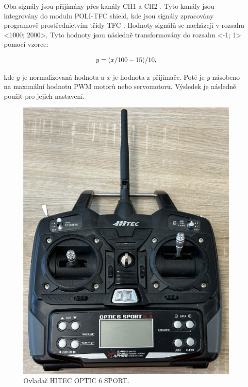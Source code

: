 Oba signály jsou přijímány přes kanály CH1 a CH2 \cite{RC}. Tyto kanály jsou
integrovány do modulu POLI-TFC shield, kde jsou signály zpracovány programově
prostřednictvím třídy TFC \cite{draha}. Hodnoty signálů se nacházejí v rozsahu
<1000; 2000>, Tyto hodnoty jsou následně transformovány do rozsahu <-1; 1> pomocí vzorce:

\begin{equation}
	\centering
	y = (x / 100 - 15) / 10,
\end{equation}

kde $y$ je normalizovaná hodnota a $x$ je hodnota z přijímače. Poté je $y$ násobeno
na maximální hodnotu PWM motorů nebo servomotoru. Výsledek je následně použit pro
jejich nastavení.

\begin{figure}[!h]
    \centering
    \includegraphics[width = .5\linewidth]{Figures/Joystick.png}
    \caption{Ovladač HITEC OPTIC 6 SPORT.}
    \label{fig:Joystick}
\end{figure}

\endinput

